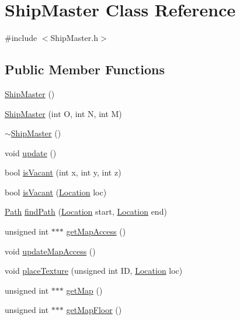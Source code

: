 \hypertarget{classShipMaster}{\section{Ship\-Master Class Reference}
\label{classShipMaster}
}


{\ttfamily \#include $<$Ship\-Master.\-h$>$}

\subsection*{Public Member Functions}
\begin{DoxyCompactItemize}
\item 
\hyperlink{classShipMaster_a607690189ed059378e939c9500909c9a}{Ship\-Master} ()
\item 
\hyperlink{classShipMaster_aad717c55623a33a03bab50381e0386e1}{Ship\-Master} (int O, int N, int M)
\item 
\hyperlink{classShipMaster_a1000b9a0ab83b8984a3d1e72f9db621e}{$\sim$\-Ship\-Master} ()
\item 
void \hyperlink{classShipMaster_a2e1b2737d8c4ab6ff0c64b046d437718}{update} ()
\item 
bool \hyperlink{classShipMaster_a2225b60d05aa9229f93856ad7b916b58}{is\-Vacant} (int x, int y, int z)
\item 
bool \hyperlink{classShipMaster_ae2f8c7068a577e8cddabc28583be8cf8}{is\-Vacant} (\hyperlink{structLocation}{Location} loc)
\item 
\hyperlink{classPath}{Path} \hyperlink{classShipMaster_aa5c31f505493362afdef36a00ba94956}{find\-Path} (\hyperlink{structLocation}{Location} start, \hyperlink{structLocation}{Location} end)
\item 
unsigned int $\ast$$\ast$$\ast$ \hyperlink{classShipMaster_a334be261a5e3d9c50caa7506f0b2609c}{get\-Map\-Access} ()
\item 
void \hyperlink{classShipMaster_a73b87519cbfc8289f9628695ebcc0cdb}{update\-Map\-Access} ()
\item 
void \hyperlink{classShipMaster_ae90bf5dd5fa1cbf24a4ddbd7b84e3446}{place\-Texture} (unsigned int I\-D, \hyperlink{structLocation}{Location} loc)
\item 
unsigned int $\ast$$\ast$$\ast$ \hyperlink{classShipMaster_a3e988a956e4bca6faf7e1f351637de0b}{get\-Map} ()
\item 
unsigned int $\ast$$\ast$$\ast$ \hyperlink{classShipMaster_abaee05a988ec56e50a3cef4c92a548cd}{get\-Map\-Floor} ()
\item 

\end{DoxyCompactItemize}
